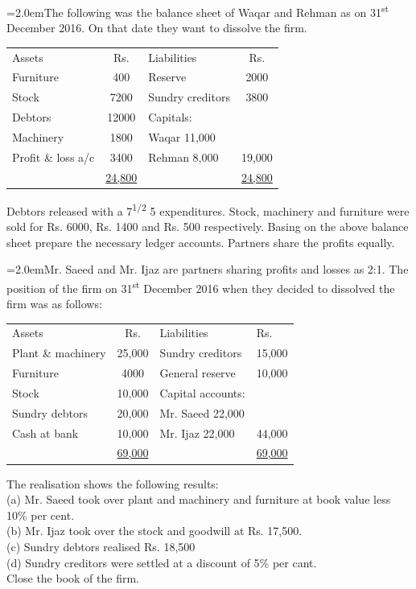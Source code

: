 \documentclass[11pt,a4paper]{article}
\newcommand{\lqn}[2]{\Needspace{6\baselineskip}\par\medskip\noindent\hangindent=2.0em\hangafter=1\makebox[2.0em][l]{\textbf{#1.}}#2\par}
\begin{document}
\lqn{110}{The following was the balance sheet of Waqar and Rehman as on 31\textsuperscript{st} December 2016. On that date they want to dissolve the firm.\par
\par\smallskip\noindent\hspace*{1.2em}\begin{tabular}{|lclc|}
\hline
Assets & Rs. & Liabilities & Rs. \\
Furniture & 400 & Reserve & 2000 \\
Stock & 7200 & Sundry creditors & 3800 \\
Debtors & 12000 & Capitals: &  \\
Machinery & 1800 & Waqar            11,000 &  \\
Profit \& loss a/c & 3400 & Rehman           8,000 & 19,000 \\
 & \underline{24,800} &  & \underline{24,800} \\
\hline
\end{tabular}\par\smallskip
Debtors released with a 7\textsuperscript{1/2} 5 expenditures. Stock, machinery and furniture were sold for Rs. 6000, Rs. 1400 and Rs. 500 respectively. Basing on the above balance sheet prepare the necessary ledger accounts. Partners share the profits equally.\par
}
\lqn{111}{Mr. Saeed and Mr. Ijaz are partners sharing profits and losses as 2:1. The position of the firm on 31\textsuperscript{st} December 2016 when they decided to dissolved the firm was as follows:\par
\par\smallskip\noindent\hspace*{1.2em}\begin{tabular}{|lcll|}
\hline
Assets & Rs. & Liabilities & Rs. \\
Plant \& machinery & 25,000 & Sundry creditors & 15,000 \\
Furniture & 4000 & General reserve & 10,000 \\
Stock & 10,000 & Capital accounts: &  \\
Sundry debtors & 20,000 & Mr. Saeed      22,000 &  \\
Cash at bank & 10,000 & Mr. Ijaz            22,000 & 44,000 \\
 & \underline{69,000} &  & \underline{69,000} \\
\hline
\end{tabular}\par\smallskip
The realisation shows the following results:\\
(a) Mr. Saeed took over plant and machinery and furniture at book value less 10\% per cent.\\
(b) Mr. Ijaz took over the stock and goodwill at Rs. 17,500.\\
(c) Sundry debtors realised Rs. 18,500\\
(d) Sundry creditors were settled at a discount of 5\% per cant.\\
Close the book of the firm.\par
}
\end{document}
